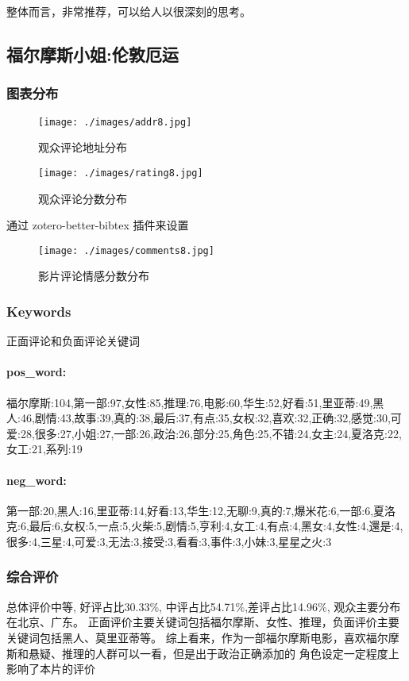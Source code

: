 \documentclass[12pt]{article}
\begin{document}
整体而言，非常推荐，可以给人以很深刻的思考。


\subsection*{福尔摩斯小姐:伦敦厄运}
\subsubsection*{图表分布}
\begin{figure}[H]
    \centering
    \begin{minipage}[t]{0.48\textwidth}
    \centering
    \texttt{[image: ./images/addr8.jpg]}
    \caption{观众评论地址分布}
    \end{minipage}
    \begin{minipage}[t]{0.48\textwidth}
    \centering
    \texttt{[image: ./images/rating8.jpg]}
    \caption{观众评论分数分布}
    \end{minipage}
\end{figure}通过 zotero-better-bibtex 插件来设置
\begin{figure}[H]
    \centering
    \texttt{[image: ./images/comments8.jpg]}
    \caption{影片评论情感分数分布} 
\end{figure} 
\subsubsection*{Keywords}
正面评论和负面评论关键词
\paragraph*{pos\_word:}
福尔摩斯:104,第一部:97,女性:85,推理:76,电影:60,华生:52,好看:51,里亚蒂:49,黑人:46,剧情:43,故事:39,真的:38,最后:37,有点:35,女权:32,喜欢:32,正确:32,感觉:30,可爱:28,很多:27,小姐:27,一部:26,政治:26,部分:25,角色:25,不错:24,女主:24,夏洛克:22,女工:21,系列:19
\paragraph*{neg\_word:}
第一部:20,黑人:16,里亚蒂:14,好看:13,华生:12,无聊:9,真的:7,爆米花:6,一部:6,夏洛克:6,最后:6,女权:5,一点:5,火柴:5,剧情:5,亨利:4,女工:4,有点:4,黑女:4,女性:4,還是:4,很多:4,三星:4,可爱:3,无法:3,接受:3,看看:3,事件:3,小妹:3,星星之火:3
\subsubsection*{综合评价}
总体评价中等, 好评占比30.33\%, 中评占比54.71\%,差评占比14.96\%, 观众主要分布在北京、广东。
正面评价主要关键词包括福尔摩斯、女性、推理，负面评价主要关键词包括黑人、莫里亚蒂等。
综上看来，作为一部福尔摩斯电影，喜欢福尔摩斯和悬疑、推理的人群可以一看，但是出于政治正确添加的
角色设定一定程度上影响了本片的评价
\end{document}
